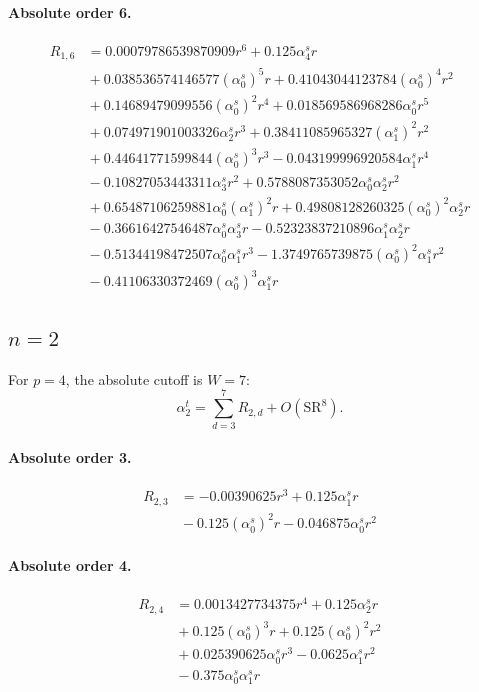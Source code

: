 \documentclass[10pt]{article}
\begin{document}
\paragraph{Absolute order 6.}
\begin{align*}
R_{1,6} &= 0.00079786539870909 r^{6} + 0.125 \alpha_{4}^s r \\
&{}  + 0.038536574146577 \left(\alpha_{0}^s\right)^{5} r + 0.41043044123784 \left(\alpha_{0}^s\right)^{4} r^{2} \\
&{}  + 0.14689479099556 \left(\alpha_{0}^s\right)^{2} r^{4} + 0.018569586968286 \alpha_{0}^s r^{5} \\
&{}  + 0.074971901003326 \alpha_{2}^s r^{3} + 0.38411085965327 \left(\alpha_{1}^s\right)^{2} r^{2} \\
&{}  + 0.44641771599844 \left(\alpha_{0}^s\right)^{3} r^{3} - 0.043199996920584 \alpha_{1}^s r^{4} \\
&{}  - 0.10827053443311 \alpha_{3}^s r^{2} + 0.5788087353052 \alpha_{0}^s \alpha_{2}^s r^{2} \\
&{}  + 0.65487106259881 \alpha_{0}^s \left(\alpha_{1}^s\right)^{2} r + 0.49808128260325 \left(\alpha_{0}^s\right)^{2} \alpha_{2}^s r \\
&{}  - 0.36616427546487 \alpha_{0}^s \alpha_{3}^s r - 0.52323837210896 \alpha_{1}^s \alpha_{2}^s r \\
&{}  - 0.51344198472507 \alpha_{0}^s \alpha_{1}^s r^{3} - 1.3749765739875 \left(\alpha_{0}^s\right)^{2} \alpha_{1}^s r^{2} \\
&{}  - 0.41106330372469 \left(\alpha_{0}^s\right)^{3} \alpha_{1}^s r
\end{align*}

\subsection{$n=2$}
For $p=4$, the absolute cutoff is $W=7$:
\[\alpha_{2}^t=\sum_{d=3}^{7}R_{2,d}+O(\mathrm{SR}^{8}).\]
\paragraph{Absolute order 3.}
\begin{align*}
R_{2,3} &=  - 0.00390625 r^{3} + 0.125 \alpha_{1}^s r \\
&{}  - 0.125 \left(\alpha_{0}^s\right)^{2} r - 0.046875 \alpha_{0}^s r^{2}
\end{align*}

\paragraph{Absolute order 4.}
\begin{align*}
R_{2,4} &= 0.0013427734375 r^{4} + 0.125 \alpha_{2}^s r \\
&{}  + 0.125 \left(\alpha_{0}^s\right)^{3} r + 0.125 \left(\alpha_{0}^s\right)^{2} r^{2} \\
&{}  + 0.025390625 \alpha_{0}^s r^{3} - 0.0625 \alpha_{1}^s r^{2} \\
&{}  - 0.375 \alpha_{0}^s \alpha_{1}^s r
\end{align*}
\end{document}
